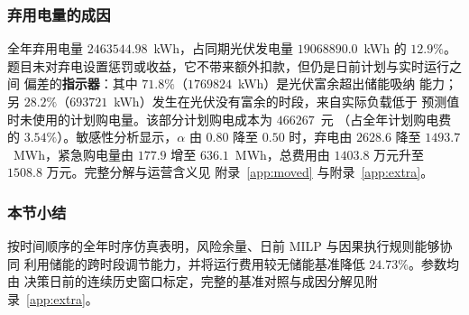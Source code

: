\documentclass[withoutpreface,bwprint]{cumcmthesis}
\begin{document}
\subsubsection{弃用电量的成因}

全年弃用电量 $2463544.98$~kWh，占同期光伏发电量 $19068890.0$~kWh 的 $12.9\%$。
题目未对弃电设置惩罚或收益，它不带来额外扣款，但仍是日前计划与实时运行之间
偏差的\textbf{指示器}：其中 $71.8\%$（$1769824$~kWh）是光伏富余超出储能吸纳
能力；另 $28.2\%$（$693721$~kWh）发生在光伏没有富余的时段，来自实际负载低于
预测值时未使用的计划购电量。该部分计划购电成本为 $466267$~元
（占全年计划购电费的 $3.54\%$）。敏感性分析显示，$\alpha$ 由 $0.80$ 降至
$0.50$ 时，弃电由 $2628.6$ 降至 $1493.7$~MWh，紧急购电量由 $177.9$ 增至
$636.1$~MWh，总费用由 $1403.8$ 万元升至 $1508.8$ 万元。完整分解与运营含义见
附录~\ref{app:moved} 与附录~\ref{app:extra}。

\subsubsection{本节小结}

按时间顺序的全年时序仿真表明，风险余量、日前 MILP 与因果执行规则能够协同
利用储能的跨时段调节能力，并将运行费用较无储能基准降低 $24.73\%$。参数均由
决策日前的连续历史窗口标定，完整的基准对照与成因分解见附录~\ref{app:extra}。





\end{document}
